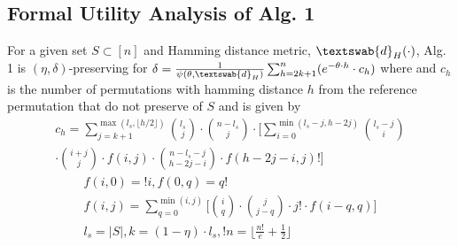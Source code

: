 \subsection{Formal Utility Analysis of Alg. 1}\label{app:utility:formal}
\begin{thm}For a given set $S \subset [n]$ and Hamming distance metric,  $\textswab{d}_H(\cdot)$,   Alg. 1 is $(\eta,\delta)$-preserving for $\delta=\frac{1}{\psi(\theta, \textswab{d}_H)}\sum_{h=2k+1}^{n} (e^{-\theta\cdot h} \cdot c_h)$ where \scalebox{0.9}{$k=\lceil(1-\eta)\cdot |S|\rceil$} and $c_h$ is the number of permutations with hamming distance $h$ from the reference permutation that do not preserve \scalebox{0.9}{$\eta\%$} of $S$ and is given by
\begin{gather*}c_h=\sum_{j=k+1}^{\max(l_s,\lfloor h/2\rfloor)}\binom{l_s}{j}\cdot \binom{n-l_s}{j}\cdot \Bigg[\sum_{i=0}^{\min(l_s-j,h-2j)}\binom{l_s-j}{i}\\\cdot \binom{i+j}{j}\cdot f(i,j)\cdot\binom{n-l_s-j}{h-2j-i} \cdot f(h-2j-i,j)!\Bigg]\end{gather*}\begin{gather*}
f(i,0)=!i, f(0,q)=q!\\
f(i,j)=\sum_{q=0}^{\min(i,j)}\Bigg[\binom{i}{q}\cdot\binom{j}{j-q}\cdot j! \cdot f(i-q,q)\Bigg]\\l_s=|S|, k=(1-\eta)\cdot l_s, !n=\lfloor \frac{n!}{e}+\frac{1}{2}\rfloor\end{gather*}\end{thm}
